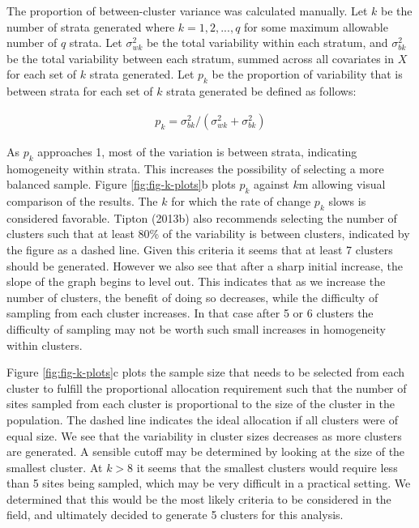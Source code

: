 \documentclass[man,floatsintext]{apa6}
\begin{document}
The proportion of between-cluster variance was calculated manually. Let \(k\) be the number of strata generated where \(k = 1, 2, ..., q\) for some maximum allowable number of \(q\) strata. Let \(\sigma_{wk}^2\) be the total variability within each stratum, and \(\sigma_{bk}^2\) be the total variability between each stratum, summed across all covariates in \(X\) for each set of \(k\) strata generated. Let \(p_k\) be the proportion of variability that is between strata for each set of \(k\) strata generated be defined as follows:

\begin{align} \label{eq:pk}
  p_k = \sigma_{bk}^2/(\sigma_{wk}^2 + \sigma_{bk}^2)
\end{align}

As \(p_k\) approaches 1, most of the variation is between strata, indicating homogeneity within strata. This increases the possibility of selecting a more balanced sample. Figure \ref{fig:fig-k-plots}b plots \(p_k\) against \(k\)m allowing visual comparison of the results. The \(k\) for which the rate of change \(p_k\) slows is considered favorable. Tipton (2013b) also recommends selecting the number of clusters such that at least 80\% of the variability is between clusters, indicated by the figure as a dashed line. Given this criteria it seems that at least 7 clusters should be generated. However we also see that after a sharp initial increase, the slope of the graph begins to level out. This indicates that as we increase the number of clusters, the benefit of doing so decreases, while the difficulty of sampling from each cluster increases. In that case after 5 or 6 clusters the difficulty of sampling may not be worth such small increases in homogeneity within clusters.

Figure \ref{fig:fig-k-plots}c plots the sample size that needs to be selected from each cluster to fulfill the proportional allocation requirement such that the number of sites sampled from each cluster is proportional to the size of the cluster in the population. The dashed line indicates the ideal allocation if all clusters were of equal size. We see that the variability in cluster sizes decreases as more clusters are generated. A sensible cutoff may be determined by looking at the size of the smallest cluster. At \(k > 8\) it seems that the smallest clusters would require less than 5 sites being sampled, which may be very difficult in a practical setting. We determined that this would be the most likely criteria to be considered in the field, and ultimately decided to generate 5 clusters for this analysis.
\end{document}

